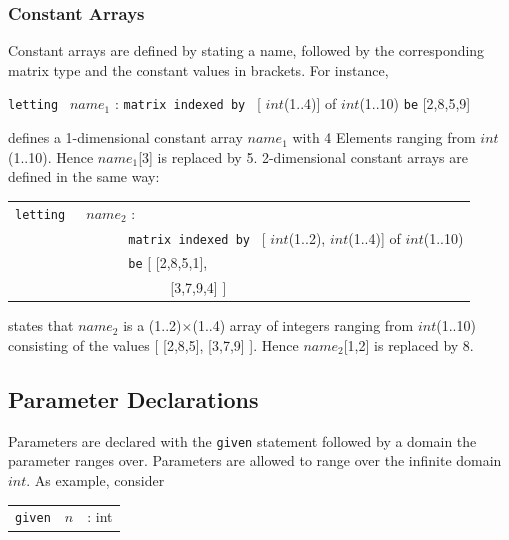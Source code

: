 \documentclass[oneside]{book}
\begin{document}
\subsubsection{Constant Arrays}
Constant arrays are defined by stating a name, followed by 
the corresponding matrix type and the constant values in brackets.
For instance,
\begin{center}
{\tt letting }   $name_1$ :  {\tt matrix indexed by } [ $int$(1..4)] of $int$(1..10)  {\tt be}   [2,8,5,9]\\
\end{center}
defines a 1-dimensional constant array $name_1$ with 4 Elements
ranging from $int$(1..10). Hence  $name_1$[3] is replaced by 5.
2-dimensional constant arrays are defined in the same way:
\begin{center}
\begin{tabular}{ll}
{\tt letting }&  $name_2$ : \\
      &\ \ \ \ \ \  {\tt matrix indexed by } [ $int$(1..2), $int$(1..4)] of $int$(1..10) \\
 & \ \ \ \ \ \   {\tt be}  [ [2,8,5,1], \\
 & \ \ \ \ \ \ \ \ \ \ \ \ [3,7,9,4] ]   \\
\end{tabular}
\end{center}
states that $name_2$ is a (1..2)$\times$(1..4) array of integers ranging from
$int$(1..10) consisting of the values [ [2,8,5], [3,7,9] ]. Hence
$name_2$[1,2] is replaced by 8. 




\subsection{Parameter Declarations}
Parameters are declared with the {\tt given} statement followed 
by a domain the parameter ranges over. Parameters are allowed to 
range over the infinite domain $int$. As example, consider
\begin{center}
\begin{tabular}{lll}
{\tt given} & $n$ & : int \\
\end{tabular}
\end{center}
\end{document}
